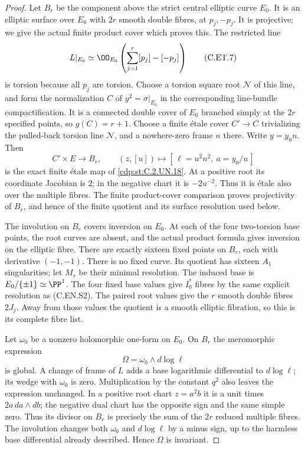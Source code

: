 \begin{proof}
Let $B_r$ be the component above the
strict central elliptic curve $E_0$.
It is an elliptic surface over $E_0$
with $2r$ smooth double fibres, at
$p_j,-p_j$. It is projective; we
give the actual finite product cover
which proves this. The restricted line
\[
 L|_{E_0}\simeq
       \OO_{E_0}\left(\sum_{j=1}^r[p_j]-[-p_j]\right)
                                                               \tag{C.ET.7}\label{cdp:eq:C.ET.7}
\]
is torsion because all $p_j$ are torsion.
Choose a torsion square root $\mathcal N$
of this line, and form the normalization
$C$ of $y^2=\sigma|_{E_0}$ in the
corresponding line-bundle compactification.
It is a connected double cover of $E_0$
branched simply at the $2r$ specified
points, so $g(C)=r+1$.
Choose a finite \'etale cover $C'\to C$
trivializing the pulled-back torsion
line $\mathcal N$, and a nowhere-zero
frame $n$ there. Write $y=y_0n$.
Then
\[
 C'\times E\longrightarrow B_r,\qquad
 (z,[u])\longmapsto
             [\,\ell=u^2n^2,\ a=y_0/u\,]             \tag{C.ET.8}\label{cdp:eq:C.ET.8}
\]
is the exact finite \'etale map of \ref{cdp:st:C.2.UN.18}.
At a positive root its coordinate Jacobian
is $2$; in the negative chart it is
$-2u^{-2}$. Thus it is \'etale also
over the multiple fibres. The finite
product-cover comparison proves
projectivity of $B_r$, and hence of
the finite quotient and its surface
resolution used below.

The involution on $B_r$ covers inversion
on $E_0$. At each of the four two-torsion
base points, the root curves are absent,
and the actual product formula gives
inversion on the elliptic fibre.
There are exactly sixteen fixed points
on $B_r$, each with derivative $(-1,-1)$.
There is no fixed curve. Its quotient
has sixteen $A_1$ singularities; let
$M_r$ be their minimal resolution.
The induced base is
$E_0/\{\pm1\}\simeq\PP^1$.
The four fixed base values give $I_0^*$
fibres by the same explicit resolution
as (C.EN.S2). The paired root values
give the $r$ smooth double fibres
$2J_j$. Away from those values the
quotient is a smooth elliptic fibration,
so this is its complete fibre list.

Let $\omega_0$ be a nonzero holomorphic
one-form on $E_0$. On $B_r$ the
meromorphic expression
\[
                        \Omega=\omega_0\wedge d\log\ell
                                                               \tag{C.ET.9}\label{cdp:eq:C.ET.9}
\]
is global. A change of frame of $L$
adds a base logarithmic differential
to $d\log\ell$; its wedge with
$\omega_0$ is zero. Multiplication
by the constant $q^2$ also leaves
the expression unchanged. In a
positive root chart $z=a^2b$ it is
a unit times $2a\,da\wedge db$;
the negative dual chart has the
opposite sign and the same simple
zero. Thus its divisor on $B_r$
is precisely the sum of the
$2r$ reduced multiple fibres.
The involution changes both
$\omega_0$ and $d\log\ell$ by a
minus sign, up to the harmless
base differential already described.
Hence $\Omega$ is invariant.


\end{proof}
